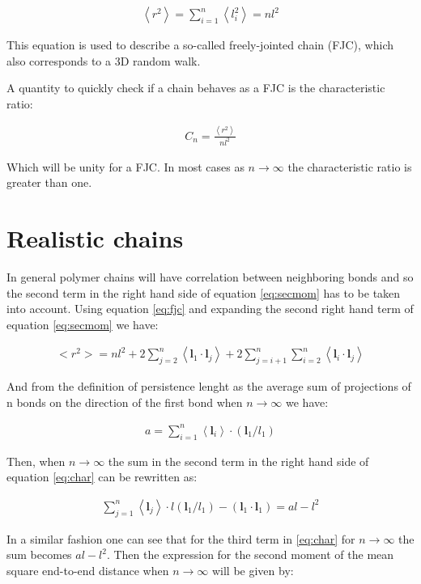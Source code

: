 \begin{gather}
\label{eq:fjc}  
\left<r^2 \right> = \sum_{i=1}^{n}\left<l_{i}^2\right> = nl^2
\end{gather}  

This equation is used to describe a so-called freely-jointed chain
(FJC), which also corresponds to a 3D random walk.

A quantity to quickly check if a chain behaves as a FJC is the
characteristic ratio:

\begin{gather}
C_{n}=\frac{\left<r^{2}\right>}{nl^{2}}
\end{gather}

Which will be unity for a FJC. In most cases as $n \to \infty$ the
characteristic ratio is greater than one.

\section{Realistic chains}
In general polymer chains will have correlation between neighboring
bonds and so the second term in the right hand side of equation
\ref{eq:secmom} has to be taken into account.
Using equation \ref{eq:fjc} and expanding the second right
hand term of equation \ref{eq:secmom} we have:

\begin{gather}
\label{eq:char}  
<r^{2}> = nl^{2} + 2 \sum_{j=2}^{n}
\left<  \mathbf{l}_{1} \cdot \mathbf{l}_{j}\right> +
2 \sum_{j=i+1}^{n}\sum_{i=2}^{n}
\left<  \mathbf{l}_{i} \cdot \mathbf{l}_{j}\right>
\end{gather}

And from the definition of persistence lenght as the average sum of
projections of n bonds on the direction of the first bond when $n \to
\infty$ we have:

\begin{gather}
a = \sum_{i=1}^{n} \left<\mathbf{l}_{i}\right> \cdot (\mathbf{l}_{1}/l_{1})
\end{gather}
  
Then, when $n \to \infty$ the sum in the second term in the right hand
side of equation \ref{eq:char} can be rewritten as:

\begin{gather}
\sum_{j=1}^{n} \left<\mathbf{l}_{j}\right> \cdot l(\mathbf{l}_{1}/l_{1}) -(\mathbf{l}_{1}
\cdot \mathbf{l}_{1}) = al - l^{2}
\end{gather}  

In a similar fashion one can see that for the third term in
\ref{eq:char} for $n \to \infty$ the sum becomes $al-l^{2}$.
Then the expression for the second moment of the mean square
end-to-end distance when $n \to \infty$ will be given by:

